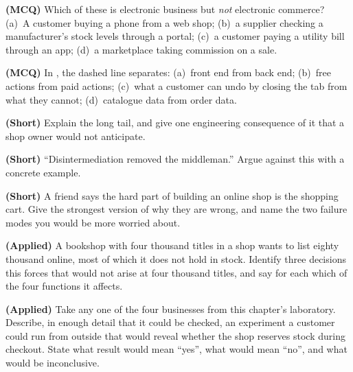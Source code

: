 \begin{reviewq}
  \item \textbf{(MCQ)} Which of these is electronic business but \emph{not}
        electronic commerce? (a)~A customer buying a phone from a web shop;
        (b)~a supplier checking a manufacturer's stock levels through a portal;
        (c)~a customer paying a utility bill through an app; (d)~a marketplace
        taking commission on a sale.
  \item \textbf{(MCQ)} In , the dashed line separates:
        (a)~front end from back end; (b)~free actions from paid actions;
        (c)~what a customer can undo by closing the tab from what they cannot;
        (d)~catalogue data from order data.
  \item \textbf{(Short)} Explain the long tail, and give one engineering
        consequence of it that a shop owner would not anticipate.
  \item \textbf{(Short)} ``Disintermediation removed the middleman.'' Argue
        against this with a concrete example.
  \item \textbf{(Short)} A friend says the hard part of building an online shop
        is the shopping cart. Give the strongest version of why they are wrong,
        and name the two failure modes you would be more worried about.
  \item \textbf{(Applied)} A bookshop with four thousand titles in a shop wants
        to list eighty thousand online, most of which it does not hold in stock.
        Identify three decisions this forces that would not arise at four
        thousand titles, and say for each which of the four functions it
        affects.
  \item \textbf{(Applied)} Take any one of the four businesses from this
        chapter's laboratory. Describe, in enough detail that it could be
        checked, an experiment a customer could run from outside that would
        reveal whether the shop reserves stock during checkout. State what
        result would mean ``yes'', what would mean ``no'', and what would be
        inconclusive.
\end{reviewq}
